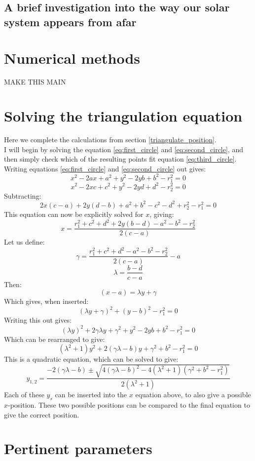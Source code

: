 \documentclass[a4paper,10pt,english]{article}
\begin{document}
\subsection{A brief investigation into the way our solar system appears from afar}
\begin{appendix}
\section{Numerical methods}
MAKE THIS MAIN
\section{Solving the triangulation equation}\label{ap:solving_triangulation}
Here we complete the calculations from section \ref{triangulate_position}.\\
\linebreak
I will begin by solving the equation \ref{eq:first_circle} and \ref{eq:second_circle}, and then simply check which of the resulting points fit equation \ref{eq:third_circle}. Writing equations \ref{eq:first_circle} and \ref{eq:second_circle} out gives:
$$x^2 - 2ax+a^2+y^2-2yb+b^2 -r_1^2 = 0$$
$$x^2 - 2xc + c^2 + y^2 - 2yd + d^2 - r_2^2 =0$$
Subtracting:
$$2x(c-a)+2y(d-b)+a^2+b^2-c^2-d^2 +r_2^2 - r_1^2 = 0$$
This equation can now be explicitly solved for $x$, giving:
$$x=\frac{r_1^2+c^2+d^2+2y(b-d)-a^2-b^2-r_2^2}{2(c-a)}$$
Let us define:
$$\gamma = \frac{r_1^2+c^2+d^2-a^2-b^2-r_2^2}{2(c-a)}-a$$
$$\lambda = \frac{b-d}{c-a}$$
Then:
$$(x-a)=\lambda y + \gamma$$
Which gives, when inserted:
$$(\lambda y + \gamma)^2+(y-b)^2-r_1^2=0$$
Writing this out gives:
$$\left(\lambda y\right)^2+2\gamma \lambda y +\gamma^2 + y^2 - 2yb+b^2-r_1^2=0$$
Which can be rearranged to give:
$$(\lambda^2 +1)y^2+2(\gamma \lambda -b)y+\gamma^2+b^2-r_1^2=0$$
This is a quadratic equation, which can be solved to give:
$$y_{1,2}=\frac{-2(\gamma\lambda-b)\pm \sqrt{4(\gamma \lambda - b)^2 -4(\lambda^2+1)(\gamma^2+b^2-r_1^2)}}{2(\lambda^2+1)}$$
Each of these $y_s$ can be inserted into the $x$ equation above, to also give a possible $x$-position. These two possible positions can be compared to the final equation to give the correct position.
\section{Pertinent parameters}
\end{appendix}
\end{document}
